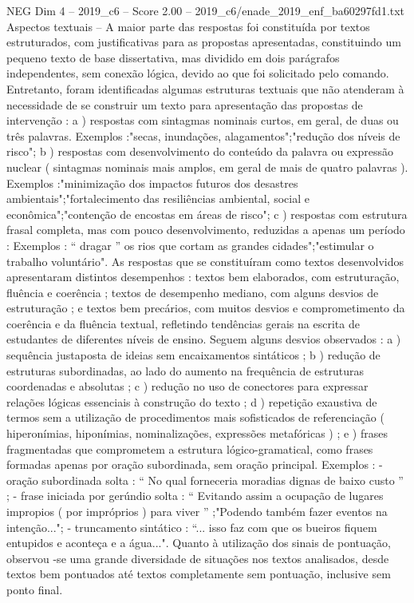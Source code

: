 \begin{textsample}{NEG Dim 4 – 2019\_c6 – Score 2.00 – 2019\_c6/enade\_2019\_enf\_ba60297fd1.txt}
Aspectos textuais – A maior parte das respostas foi constituída por textos estruturados, com justificativas para as propostas apresentadas, constituindo um pequeno texto de base dissertativa, mas dividido em dois parágrafos independentes, sem conexão lógica, devido ao que foi solicitado pelo comando.
Entretanto, foram identificadas algumas estruturas textuais que não atenderam à necessidade de se construir um texto para apresentação das propostas de intervenção : a ) respostas com sintagmas nominais curtos, em geral, de duas ou três palavras.
Exemplos :"secas, inundações, alagamentos";"redução dos níveis de risco"; b ) respostas com desenvolvimento do conteúdo da palavra ou expressão nuclear ( sintagmas nominais mais amplos, em geral de mais de quatro palavras ).
Exemplos :"minimização dos impactos futuros dos desastres ambientais";"fortalecimento das resiliências ambiental, social e econômica";"contenção de encostas em áreas de risco"; c ) respostas com estrutura frasal completa, mas com pouco desenvolvimento, reduzidas a apenas um período : Exemplos : “ dragar ” os rios que cortam as grandes cidades";"estimular o trabalho voluntário".
As respostas que se constituíram como textos desenvolvidos apresentaram distintos desempenhos : textos bem elaborados, com estruturação, fluência e coerência ; textos de desempenho mediano, com alguns desvios de estruturação ; e textos bem precários, com muitos desvios e comprometimento da coerência e da fluência textual, refletindo tendências gerais na escrita de estudantes de diferentes níveis de ensino.
Seguem alguns desvios observados : a ) sequência justaposta de ideias sem encaixamentos sintáticos ; b ) redução de estruturas subordinadas, ao lado do aumento na frequência de estruturas coordenadas e absolutas ; c ) redução no uso de conectores para expressar relações lógicas essenciais à construção do texto ; d ) repetição exaustiva de termos sem a utilização de procedimentos mais sofisticados de referenciação ( hiperonímias, hiponímias, nominalizações, expressões metafóricas ) ; e ) frases fragmentadas que comprometem a estrutura lógico-gramatical, como frases formadas apenas por oração subordinada, sem oração principal.
Exemplos : - oração subordinada solta : “ No qual forneceria moradias dignas de baixo custo ” ; - frase iniciada por gerúndio solta : “ Evitando assim a ocupação de lugares impropios ( por impróprios ) para viver ” ;"Podendo também fazer eventos na intenção..."; - truncamento sintático : “... isso faz com que os bueiros fiquem entupidos e aconteça e a água...".
Quanto à utilização dos sinais de pontuação, observou -se uma grande diversidade de situações nos textos analisados, desde textos bem pontuados até textos completamente sem pontuação, inclusive sem ponto final.

\end{textsample}
